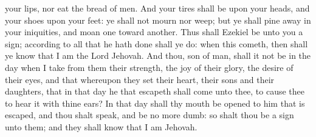 your lips, nor eat the bread of men. And your tires shall be upon your heads, and your shoes upon your feet: ye shall not mourn nor weep; but ye shall pine away in your iniquities, and moan one toward another. Thus shall Ezekiel be unto you a sign; according to all that he hath done shall ye do: when this cometh, then shall ye know that I am the Lord Jehovah.  And thou, son of man, shall it not be in the day when I take from them their strength, the joy of their glory, the desire of their eyes, and that whereupon they set their heart, their sons and their daughters, that in that day he that escapeth shall come unto thee, to cause thee to hear it with thine ears? In that day shall thy mouth be opened to him that is escaped, and thou shalt speak, and be no more dumb: so shalt thou be a sign unto them; and they shall know that I am Jehovah. 

